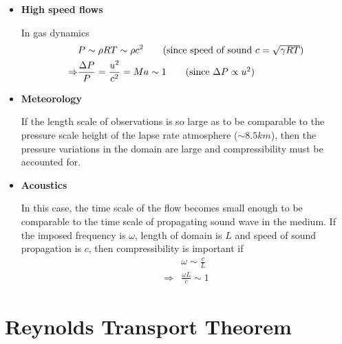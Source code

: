 \documentclass[11pt,a4paper]{article}
\newcommand{\1}{\vect{1}}
\newcommand{\RA}{\Rightarrow}
\begin{document}
\begin{itemize}
\item \textbf{High speed flows}

In gas dynamics 
\begin{align*}
&P\sim \rho R T\sim\rho c^2 \tag{since speed of sound $c= \sqrt{\gamma RT}$}\\
\RA&\frac{\Delta P}{P} = \frac{u^2}{c^2} = Ma \sim 1 \tag{since $\Delta P \propto u^2$}
\end{align*}

\item \textbf{Meteorology}

If the length scale of observations is so large as to be comparable to the pressure scale height of the lapse rate atmosphere ($\sim 8.5 km$), then the pressure variations in the domain are large and compressibility must be accounted for.

\item \textbf{Acoustics}

In this case, the time scale of the flow becomes small enough to be comparable to the time scale of propagating sound wave in the medium. If the imposed frequency is $\omega$, length of domain is $L$ and speed of sound propagation is $c$, then compressibility is important if
\begin{align*}
&\omega \sim \frac c L\\
\RA& \frac{\omega L}{c} \sim 1
\end{align*}
\end{itemize}


\section{Reynolds Transport Theorem}
\end{document}
